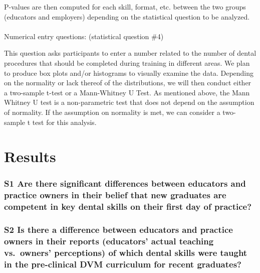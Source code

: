 \documentclass[
  11pt,
  letterpaper,
  DIV=11,
  numbers=noendperiod]{scrartcl}
\makeatletter
\let\oldparagraph\paragraph
\renewcommand{\paragraph}{
    \@ifstar
      \xxxParagraphStar
      \xxxParagraphNoStar
  }
\newcommand{\xxxParagraphStar}[1]{\oldparagraph*{#1}\mbox{}}
\newcommand{\xxxParagraphNoStar}[1]{\oldparagraph{#1}\mbox{}}
\numberwithin{figure}{section}
\makeatother
\begin{document}
P-values are then computed for each skill, format, etc. between the two
groups (educators and employers) depending on the statistical question
to be analyzed.

\paragraph{Numerical entry questions: (statistical question
\#4)}\label{numerical-entry-questions-statistical-question-4}

This question asks participants to enter a number related to the number
of dental procedures that should be completed during training in
different areas. We plan to produce box plots and/or histograms to
visually examine the data. Depending on the normality or lack thereof of
the distributions, we will then conduct either a two-sample t-test or a
Mann-Whitney U Test. As mentioned above, the Mann Whitney U test is a
non-parametric test that does not depend on the assumption of normality.
If the assumption on normality is met, we can consider a two-sample t
test for this analysis.

\section{Results}\label{results}

\subsubsection{S1 Are there significant differences between educators
and practice owners in their belief that new graduates are competent in
key dental skills on their first day of
practice?}\label{s1-are-there-significant-differences-between-educators-and-practice-owners-in-their-belief-that-new-graduates-are-competent-in-key-dental-skills-on-their-first-day-of-practice}

\subsubsection{S2 Is there a difference between educators and practice
owners in their reports (educators' actual teaching vs.~owners'
perceptions) of which dental skills were taught in the pre-clinical DVM
curriculum for recent
graduates?}\label{s2-is-there-a-difference-between-educators-and-practice-owners-in-their-reports-educators-actual-teaching-vs.-owners-perceptions-of-which-dental-skills-were-taught-in-the-pre-clinical-dvm-curriculum-for-recent-graduates}
\end{document}
